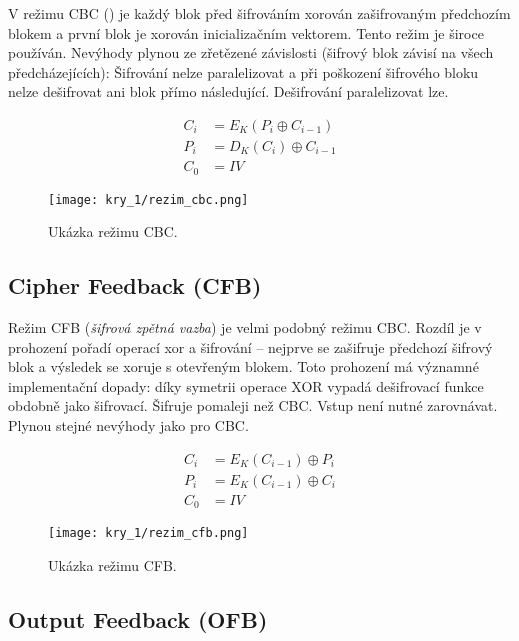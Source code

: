 V režimu CBC () je každý blok před šifrováním xorován zašifrovaným předchozím blokem a první blok je xorován inicializačním vektorem. Tento režim je široce používán. Nevýhody plynou ze zřetězené závislosti (šifrový blok závisí na všech předcházejících): Šifrování nelze paralelizovat a při poškození šifrového bloku nelze dešifrovat ani blok přímo následující. Dešifrování paralelizovat lze.

\begin{equation}
\begin{aligned}
C_i &= E_K (P_i \oplus C_{i-1}) \\
P_i &= D_K(C_i) \oplus C_{i-1} \\
C_0 &= IV
\end{aligned}
\end{equation}

\begin{figure}[H]
    \centering
    \texttt{[image: kry\_1/rezim\_cbc.png]}
    \caption{Ukázka režimu CBC.}
\end{figure}

\subsection*{Cipher Feedback (CFB)}

Režim CFB (\textit{šifrová zpětná vazba}) je velmi podobný režimu CBC. Rozdíl je v prohození pořadí operací xor a šifrování -- nejprve se zašifruje předchozí šifrový blok a výsledek se xoruje s otevřeným blokem. Toto prohození má významné implementační dopady: díky symetrii operace XOR vypadá dešifrovací funkce obdobně jako šifrovací. Šifruje pomaleji než CBC. Vstup není nutné zarovnávat. Plynou stejné nevýhody jako pro CBC.

\begin{equation}
\begin{aligned}
C_i &= E_K (C_{i-1}) \oplus P_i \\
P_i &= E_K (C_{i-1}) \oplus C_i \\
C_0 &= IV
\end{aligned}
\end{equation}

\begin{figure}[H]
    \centering
    \texttt{[image: kry\_1/rezim\_cfb.png]}
    \caption{Ukázka režimu CFB.}
\end{figure}

\subsection*{Output Feedback (OFB)}

